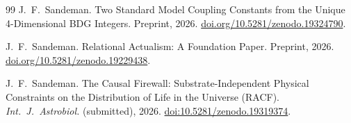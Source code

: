 \documentclass[11pt,a4paper]{article}
\theoremstyle{plain}
\theoremstyle{definition}
\theoremstyle{remark}
\begin{document}
\begin{thebibliography}{99}
J.~F.~Sandeman.
\newblock Two Standard Model Coupling Constants from the Unique 4-Dimensional
  BDG Integers.
\newblock Preprint, 2026.
\newblock \href{https://doi.org/10.5281/zenodo.19324790}{doi.org/10.5281/zenodo.19324790}.

J.~F.~Sandeman.
\newblock Relational Actualism: A Foundation Paper.
\newblock Preprint, 2026.
\newblock \href{https://doi.org/10.5281/zenodo.19229438}{doi.org/10.5281/zenodo.19229438}.


J.~F.~Sandeman.
\newblock The Causal Firewall: Substrate-Independent Physical Constraints
  on the Distribution of Life in the Universe (RACF).
\newblock \textit{Int.\ J.\ Astrobiol.} (submitted), 2026.
\newblock \href{https://doi.org/10.5281/zenodo.19319374}%
  {doi:10.5281/zenodo.19319374}.

\end{thebibliography}
\end{document}

